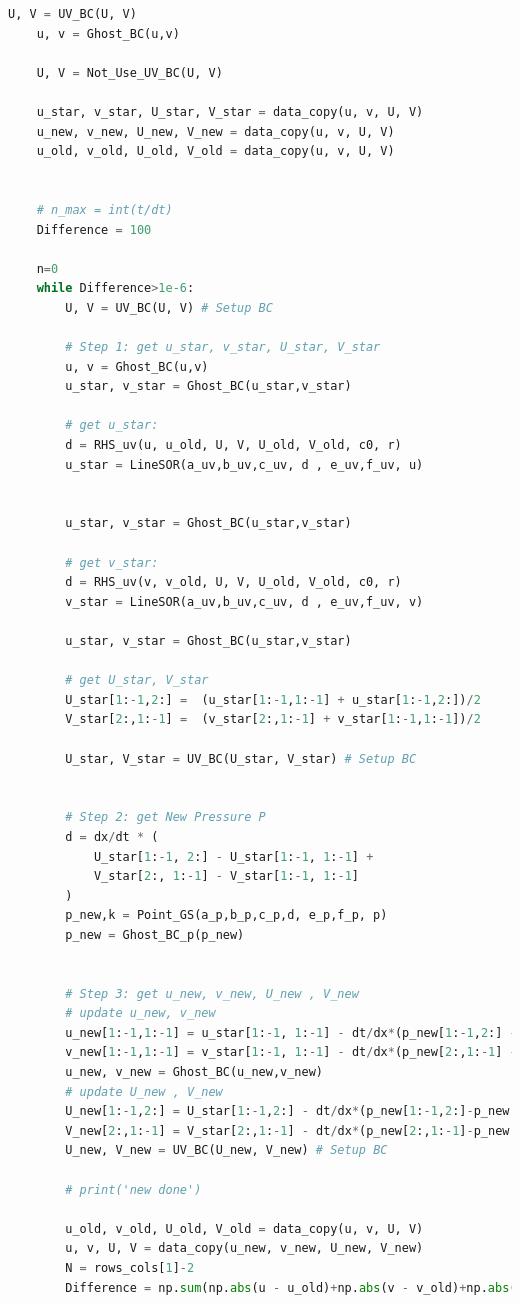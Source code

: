 \documentclass[12pt]{article}
\begin{document}
\begin{scriptsize}
\begin{lstlisting}[language=python,caption={Lid Driven Cavity Solver}]
    U, V = UV_BC(U, V)
    u, v = Ghost_BC(u,v)

    U, V = Not_Use_UV_BC(U, V) 

    u_star, v_star, U_star, V_star = data_copy(u, v, U, V) 
    u_new, v_new, U_new, V_new = data_copy(u, v, U, V) 
    u_old, v_old, U_old, V_old = data_copy(u, v, U, V)


    # n_max = int(t/dt)
    Difference = 100

    n=0
    while Difference>1e-6:
        U, V = UV_BC(U, V) # Setup BC

        # Step 1: get u_star, v_star, U_star, V_star
        u, v = Ghost_BC(u,v)
        u_star, v_star = Ghost_BC(u_star,v_star)

        # get u_star:    
        d = RHS_uv(u, u_old, U, V, U_old, V_old, c0, r)
        u_star = LineSOR(a_uv,b_uv,c_uv, d , e_uv,f_uv, u)


        u_star, v_star = Ghost_BC(u_star,v_star)

        # get v_star:
        d = RHS_uv(v, v_old, U, V, U_old, V_old, c0, r) 
        v_star = LineSOR(a_uv,b_uv,c_uv, d , e_uv,f_uv, v)

        u_star, v_star = Ghost_BC(u_star,v_star)

        # get U_star, V_star
        U_star[1:-1,2:] =  (u_star[1:-1,1:-1] + u_star[1:-1,2:])/2
        V_star[2:,1:-1] =  (v_star[2:,1:-1] + v_star[1:-1,1:-1])/2

        U_star, V_star = UV_BC(U_star, V_star) # Setup BC


        # Step 2: get New Pressure P
        d = dx/dt * (
            U_star[1:-1, 2:] - U_star[1:-1, 1:-1] +
            V_star[2:, 1:-1] - V_star[1:-1, 1:-1]
        )
        p_new,k = Point_GS(a_p,b_p,c_p,d, e_p,f_p, p)
        p_new = Ghost_BC_p(p_new)


        # Step 3: get u_new, v_new, U_new , V_new
        # update u_new, v_new
        u_new[1:-1,1:-1] = u_star[1:-1, 1:-1] - dt/dx*(p_new[1:-1,2:] - p_new[1:-1,:-2])/2 
        v_new[1:-1,1:-1] = v_star[1:-1, 1:-1] - dt/dx*(p_new[2:,1:-1] - p_new[:-2,1:-1])/2 
        u_new, v_new = Ghost_BC(u_new,v_new)
        # update U_new , V_new
        U_new[1:-1,2:] = U_star[1:-1,2:] - dt/dx*(p_new[1:-1,2:]-p_new[1:-1,1:-1])
        V_new[2:,1:-1] = V_star[2:,1:-1] - dt/dx*(p_new[2:,1:-1]-p_new[1:-1,1:-1])
        U_new, V_new = UV_BC(U_new, V_new) # Setup BC

        # print('new done')

        u_old, v_old, U_old, V_old = data_copy(u, v, U, V)
        u, v, U, V = data_copy(u_new, v_new, U_new, V_new)
        N = rows_cols[1]-2
        Difference = np.sum(np.abs(u - u_old)+np.abs(v - v_old)+np.abs(p_new - p))/N**2


\end{lstlisting}
\end{scriptsize}
\end{document}

